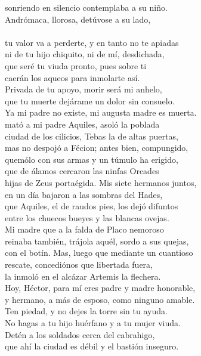 sonriendo en silencio contemplaba a su niño.\\
Andrómaca, llorosa, detúvose a su lado,\\
\\
tu valor va a perderte, y en tanto no te apiadas\\
ni de tu hijo chiquito, ni de mí, desdichada,\\
que seré tu viuda pronto, pues sobre ti\\
caerán los aqueos para inmolarte así.\\
Privada de tu apoyo, morir será mi anhelo,\\
que tu muerte dejárame un dolor sin consuelo.\\
Ya mi padre no existe, mi augusta madre es muerta.\\
mató a mi padre Aquiles, asoló la poblada\\
ciudad de los cilicios, Tebas la de altas puertas,\\
mas no despojó a Fécion; antes bien, compungido,\\
quemólo con sus armas y un túmulo ha erigido,\\
que de álamos cercaron las ninfas Orcades\\
hijas de Zeus portaégida. Mis siete hermanos juntos,\\
en un día bajaron a las sombras del Hades,\\
que Aquiles, el de raudos pies, los dejó difuntos\\
entre los chuecos bueyes y las blancas ovejas.\\
Mi madre que a la falda de Placo nemoroso\\
reinaba también, trájola aquél, sordo a sus quejas,\\
con el botín. Mas, luego que mediante un cuantioso\\
rescate, concediónos que libertada fuera,\\
la inmoló en el alcázar Artemis la flechera.\\
Hoy, Héctor, para mí eres padre y madre honorable,\\
y hermano, a más de esposo, como ninguno amable.\\
Ten piedad, y no dejes la torre sin tu ayuda.\\
No hagas a tu hijo huérfano y a tu mujer viuda.\\
Detén a los soldados cerca del cabrahigo,\\
que ahí la ciudad es débil y el bastión inseguro.\\
